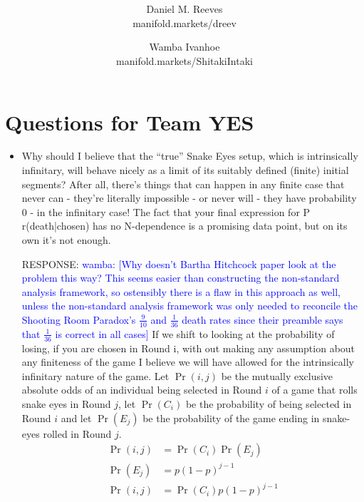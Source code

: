 \documentclass[article,twocolumn]{memoir}
\title{\HUGE\textbf{\longtitle}\\ \textbf{\shorttitle}}
\author{Daniel M. Reeves\\manifold.markets/dreev
\and
Wamba Ivanhoe\\manifold.markets/ShitakiIntaki
}
\date{\protect\tstamp} %
\newcommand{\wamba} [1]{\ifnum\Chatty=1 \textcolor{blue}{wamba:  [#1]} \fi}
\begin{document}
\pagestyle{headings}
\maketitle


\chapter*{Questions for Team YES}
\begin{itemize}
    \item Why should I believe that the “true” Snake Eyes setup, which is intrinsically infinitary, will behave nicely as a limit of its suitably defined (finite) initial segments? After all, there’s things that can happen in any finite case that never can - they’re literally impossible - or never will - they have probability 0 - in the infinitary case! The fact that your final expression for P r(death|chosen) has no N-dependence is a promising data point, but on its own it’s not enough.

    {\color{red} 
        RESPONSE: 
        \wamba{Why doesn't Bartha Hitchcock paper look at the problem this way? This seems easier than constructing the non-standard analysis framework, so ostensibly there is a flaw in this approach as well, unless the non-standard analysis framework was only needed to reconcile the Shooting Room Paradox's $\frac{9}{10}$ and $\frac{1}{36}$ death rates since their preamble says that $\frac{1}{36}$ is correct in all cases}
        If we shift to looking at the probability of losing, if you are chosen in Round i, with out making any assumption about any finiteness of the game I believe we will have allowed for the intrinsically infinitary nature of the game.
        Let $\Pr(i,j)$ be the mutually exclusive absolute odds of an individual being selected in Round $i$ of a game that rolls snake eyes in Round $j$, let $\Pr(C_i)$ be the probability of being selected in Round $i$ and let $\Pr(E_j)$ be the probability of the game ending in snake-eyes rolled in Round $j$.
            \begin{align*}
              \Pr(i,j) & = \Pr(C_i)\Pr(E_j)\\
              \Pr(E_j) & = p(1-p)^{j-1}\\
              \Pr(i,j) & = \Pr(C_i)p(1-p)^{j-1}
            \end{align*}
        
}
\end{itemize}
\end{document}
